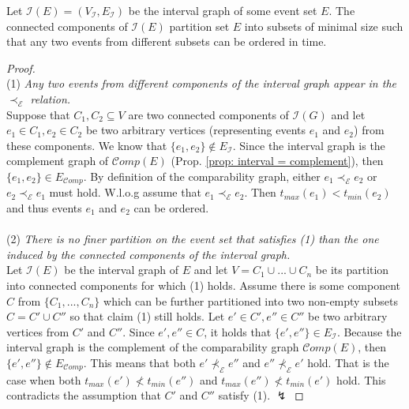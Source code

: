 \begin{theorem}\label{theorem: partitioning}
Let $\mathcal{I}(E)=(V_{\mathcal{I}},E_{\mathcal{I}})$ be the interval graph of some event set $E$.
The connected components of $\mathcal{I}(E)$ partition set $E$ into subsets of minimal size such that any two events from different subsets can be ordered in time.
\end{theorem}


\begin{proof}
\leavevmode \\ 
(1) \textit{Any two events from different components of the interval graph appear in the $\prec_{\mathcal{E}}$ relation.}\\
Suppose that $C_1, C_2 \subseteq V$ are two connected components of $\mathcal{I}(G)$ and let $e_1 \in C_1, e_2 \in C_2$ be two arbitrary vertices (representing events $e_1$ and $e_2$) from these components.
We know that $\{e_1,e_2\} \not \in E_{\mathcal{I}}$.
Since the interval graph is the complement graph of $\mathcal{C}omp(E)$ (Prop. \ref{prop: interval = complement}), then $\{e_1,e_2\} \in E_{\mathcal{C}omp}$.
By definition of the comparability graph, either $e_1 \prec_{\mathcal{E}} e_2$ or $e_2 \prec_{\mathcal{E}} e_1$ must hold.
W.l.o.g assume that $e_1 \prec_{\mathcal{E}} e_2$.
Then $t_{max}(e_1) < t_{min}(e_2)$ and thus events $e_1$ and $e_2$ can be ordered. \\ \\
(2) \textit{There is no finer partition on the event set that satisfies (1) than the one induced by the connected components of the interval graph.}\\
Let $\mathcal{I}(E)$ be the interval graph of $E$  and let $V= C_1 \cup ... \cup C_n$ be its partition into connected components for which (1) holds.
Assume there is some component $C$ from $\{C_1,...,C_n\}$ which can be further partitioned into two non-empty subsets $C=C' \cup C''$ so that claim (1) still holds.
Let $e' \in C', e'' \in C''$ be two arbitrary vertices from $C'$ and $C''$.
Since $e',e'' \in C$, it holds that $\{e',e''\} \in E_{\mathcal{I}}$. 
Because the interval graph is the complement of the comparability graph $\mathcal{C}omp(E)$, then $\{e',e''\} \not \in E_{\mathcal{C}omp}$.
This means that both $e' \not \prec_{\mathcal{E}} e''$ and $e'' \not \prec_{\mathcal{E}} e'$ hold.
That is the case when both $t_{max}(e') \not < t_{min}(e'')$ and 
$t_{max}(e'') \not < t_{min}(e')$ hold.
This contradicts the assumption that $C'$ and $C''$ satisfy (1). $\lightning$
\end{proof}

